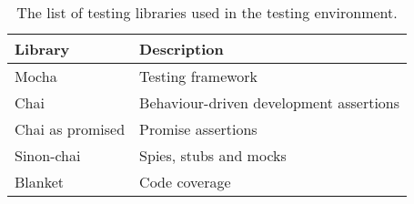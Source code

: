 
\begin{table}[H]
\caption[Testing environment]{The list of testing libraries used in the testing environment.}
\label{tab:testing_environment}
\begin{tabularx}{\textwidth}{@{}XX@{}}
	\toprule
	\textbf{Library} & \textbf{Description} \\
	\midrule
	Mocha & Testing framework \\
	Chai & Behaviour-driven development assertions \\
	Chai as promised & Promise assertions \\
	Sinon-chai & Spies, stubs and mocks \\
	Blanket & Code coverage \\
	\bottomrule
\end{tabularx}
\end{table}